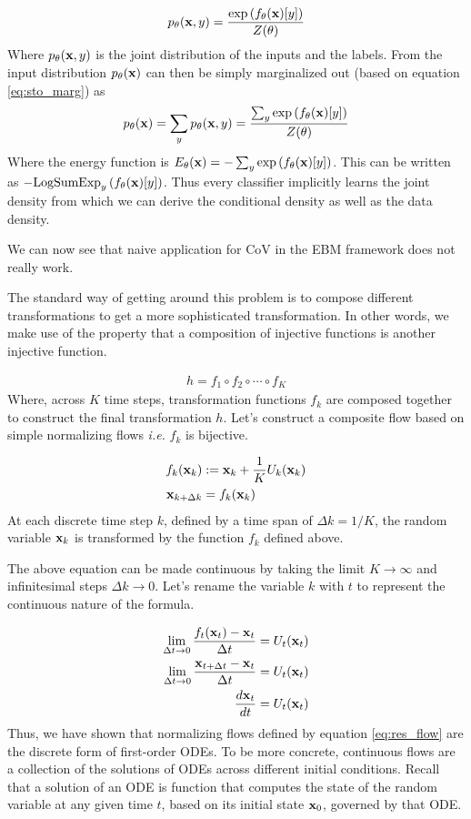 \documentclass[a4paper, 11pt]{article}
\begin{document}
\begin{align}
    p_\theta(\mbox{$\mbox{$\mathbf{x}$}$} , y) = \frac{\exp\left (f_\theta(\mbox{$\mbox{$\mathbf{x}$}$})[y]  \right )}{Z(\theta)}
\end{align}
Where $p_\theta(\mbox{$\mbox{$\mathbf{x}$}$} , y)$ is the joint distribution of the inputs and the labels. From the input distribution $p_\theta(\mbox{$\mbox{$\mathbf{x}$}$})$ can then be simply marginalized out (based on equation \eqref{eq:sto_marg}) as
\begin{align}
    p_\theta(\mbox{$\mbox{$\mathbf{x}$}$}) = \sum_y p_\theta(\mbox{$\mbox{$\mathbf{x}$}$} , y) = \frac{\sum_y\exp\left (f_\theta(\mbox{$\mbox{$\mathbf{x}$}$})[y]  \right )}{Z(\theta)}
\end{align}
Where the energy function is $E_\theta(\mbox{$\mbox{$\mathbf{x}$}$}) = - \sum_y\exp\left (f_\theta(\mbox{$\mbox{$\mathbf{x}$}$})[y]  \right )$. This can be written as $-\text{LogSumExp}_y \left (f_\theta(\mbox{$\mbox{$\mathbf{x}$}$})[y]  \right )$. Thus every classifier implicitly learns  the joint density from which we can derive the conditional density as well as the data density.

We can now see that naive application for CoV in the EBM framework does not really work.

The standard way of getting around this problem is to compose different transformations to get a more sophisticated transformation. In other words, we make use of the property that a composition of injective functions is another injective function. 

\begin{align}
    h = f_1 \circ f_2 \circ  \cdots \circ f_K
\end{align}
Where, across $K$ time steps, transformation functions $f_k$ are composed together to construct the final transformation $h$. Let's construct a composite flow based on simple normalizing flows \textit{i.e.} $f_k$ is bijective.

\begin{align}\label{eq:res_flow}
    f_k(\mbox{$\mbox{$\mathbf{x}$}$}_k) &:= \mbox{$\mbox{$\mathbf{x}$}$}_k + \frac{1}{K}U_k(\mbox{$\mbox{$\mathbf{x}$}$}_k) \\
    \mbox{$\mbox{$\mathbf{x}$}$}_{k + \Delta k} &= f_k(\mbox{$\mbox{$\mathbf{x}$}$}_k)
\end{align}
At each discrete time step $k$, defined by a time span of $\Delta k = 1/K$, the random variable $\mbox{$\mbox{$\mathbf{x}$}$}_k$ is transformed by the function $f_k$ defined above.

The above equation can be made continuous by taking the limit $K \to \infty$ and infinitesimal steps $\Delta k \to 0$. Let's rename the variable $k$ with $t$ to represent the continuous nature of the formula.

\begin{align}\label{eq:flow_ode}
    \lim_{\Delta t \to 0} \frac{f_t(\mbox{$\mbox{$\mathbf{x}$}$}_t) - \mbox{$\mbox{$\mathbf{x}$}$}_t}{\Delta t} &= U_t(\mbox{$\mbox{$\mathbf{x}$}$}_t)\\
    \lim_{\Delta t \to 0} \frac{ \mbox{$\mbox{$\mathbf{x}$}$}_{t + \Delta t} - \mbox{$\mbox{$\mathbf{x}$}$}_t}{\Delta t} &= U_t(\mbox{$\mbox{$\mathbf{x}$}$}_t) \\ 
    \frac{d \mbox{$\mbox{$\mathbf{x}$}$}_t}{dt} &= U_t(\mbox{$\mbox{$\mathbf{x}$}$}_t)
\end{align}
Thus, we have shown that normalizing flows defined by equation \eqref{eq:res_flow} are the discrete form of first-order ODEs. To be more concrete, continuous flows are a collection of the solutions of ODEs across different initial conditions. Recall that a solution of an ODE is function that computes the state of the random variable at any given time $t$, based on its initial state $\mbox{$\mbox{$\mathbf{x}$}$}_0$, governed by that ODE. 
\end{document}
